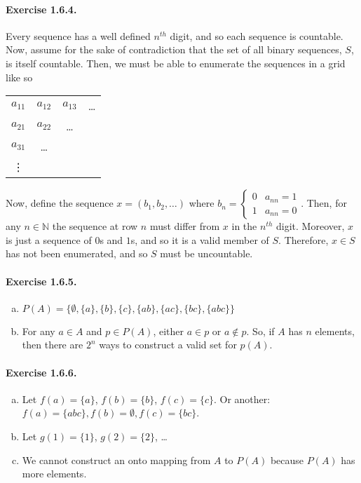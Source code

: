 \documentclass{article}
\newcommand{\N}{\mathbb{N}}
\begin{document}
\paragraph{Exercise 1.6.4.}
Every sequence has a well defined $n^{th}$ digit, and so each sequence is countable. Now, assume for the sake of contradiction that the set of all binary sequences, $S$, is itself countable. Then, we must be able to enumerate the sequences in a grid like so
\begin{center}
    \begin{tabular}{cccc}
         $a_{11}$ & $a_{12}$ & $a_{13}$ & \ldots \\
         $a_{21}$ & $a_{22}$ & \ldots \\
         $a_{31}$ & \ldots \\
         \vdots
    \end{tabular}
\end{center}
Now, define the sequence $x = (b_1,b_2,\ldots)$ where $b_n = \begin{cases}
    0 & a_{nn}=1\\
    1 & a_{nn}=0
\end{cases}$.
Then, for any $n\in \N$ the sequence at row $n$ must differ from $x$ in the $n^{th}$ digit. Moreover, $x$ is just a sequence of $0$s and $1$s, and so it is a valid member of $S$. Therefore, $x\in S$ has not been enumerated, and so $S$ must be uncountable.

\paragraph{Exercise 1.6.5.}
\begin{enumerate}[(a)]
    \item $P(A)=\{\emptyset,\{a\},\{b\},\{c\},\{ab\},\{ac\},\{bc\},\{abc\}\}$
    \item For any $a\in A$ and $p\in P(A)$, either $a\in p$ or $a\notin p$. 
    So, if $A$ has $n$ elements, then there are $2^n$ ways to construct a valid set for $p(A)$.
\end{enumerate}

\paragraph{Exercise 1.6.6.}
\begin{enumerate}[(a)]
    \item Let $f(a)=\{a\}$, $f(b)=\{b\}$, $f(c)=\{c\}$. Or another: $f(a)=\{abc\},f(b)=\emptyset,f(c)=\{bc\}$.
    \item Let $g(1)=\{1\}$, $g(2)=\{2\}$, \ldots
    \item We cannot construct an onto mapping from $A$ to $P(A)$ because $P(A)$ has more elements.
\end{enumerate}
\end{document}
